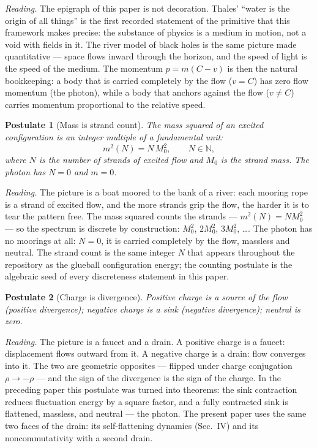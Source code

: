 \documentclass[aps,prd,preprint,superscriptaddress,amsmath,amssymb]{revtex4-2}
\newtheorem{postulate}{Postulate}[section]
\begin{document}
\emph{Reading.}  The epigraph of this paper is not decoration.
Thales' ``water is the origin of all things'' is the first recorded
statement of the primitive that this framework makes precise: the
substance of physics is a medium in motion, not a void with fields
in it.  The river model of black holes \cite{hamilton2008river} is
the same picture made quantitative --- space flows inward through
the horizon, and the speed of light is the speed of the medium.
The momentum $p=m(C-v)$ is then the natural bookkeeping: a body that
is carried completely by the flow ($v=C$) has zero flow momentum
(the photon), while a body that anchors against the flow ($v\neq C$)
carries momentum proportional to the relative speed.

\begin{postulate}[Mass is strand count]
\label{post:mass}
The mass squared of an excited configuration is an integer multiple
of a fundamental unit:
\begin{equation}
m^2(N)=N\,M_0^2,\qquad N\in\mathbb{N},
\end{equation}
where $N$ is the number of strands of excited flow and $M_0$ is the
strand mass.  The photon has $N=0$ and $m=0$.
\end{postulate}

\emph{Reading.}  The picture is a boat moored to the bank of a
river: each mooring rope is a strand of excited flow, and the more
strands grip the flow, the harder it is to tear the pattern free.
The mass squared counts the strands --- $m^2(N)=N M_0^2$ --- so the
spectrum is discrete by construction: $M_0^2$, $2M_0^2$, $3M_0^2$,
\ldots.  The photon has no moorings at all: $N=0$, it is carried
completely by the flow, massless and neutral.  The strand count is
the same integer $N$ that appears throughout the repository as the
glueball configuration energy; the counting postulate is the
algebraic seed of every discreteness statement in this paper.

\begin{postulate}[Charge is divergence]
\label{post:charge}
Positive charge is a source of the flow (positive divergence);
negative charge is a sink (negative divergence); neutral is zero.
\end{postulate}

\emph{Reading.}  The picture is a faucet and a drain.  A positive
charge is a faucet: displacement flows outward from it.  A negative
charge is a drain: flow converges into it.  The two are geometric
opposites --- flipped under charge conjugation $\rho\to-\rho$ ---
and the sign of the divergence is the sign of the charge.  In the
preceding paper this postulate was turned into theorems: the sink
contraction reduces fluctuation energy by a square factor, and a
fully contracted sink is flattened, massless, and neutral --- the
photon.  The present paper uses the same two faces of the drain:
its self-flattening dynamics (Sec.~IV) and its noncommutativity
with a second drain.
\end{document}
